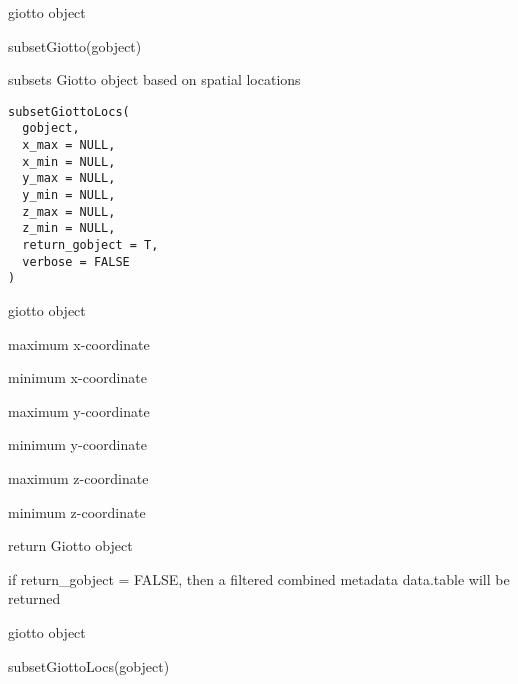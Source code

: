 \documentclass[a4paper]{book}
\begin{document}
%
\begin{Value}
giotto object
\end{Value}
%
\begin{Examples}
\begin{ExampleCode}
    subsetGiotto(gobject)
\end{ExampleCode}
\end{Examples}
%
\begin{Description}\relax
subsets Giotto object based on spatial locations
\end{Description}
%
\begin{Usage}
\begin{verbatim}
subsetGiottoLocs(
  gobject,
  x_max = NULL,
  x_min = NULL,
  y_max = NULL,
  y_min = NULL,
  z_max = NULL,
  z_min = NULL,
  return_gobject = T,
  verbose = FALSE
)
\end{verbatim}
\end{Usage}
%
\begin{Arguments}
\begin{ldescription}
\item[\code{gobject}] giotto object

\item[\code{x\_max}] maximum x-coordinate

\item[\code{x\_min}] minimum x-coordinate

\item[\code{y\_max}] maximum y-coordinate

\item[\code{y\_min}] minimum y-coordinate

\item[\code{z\_max}] maximum z-coordinate

\item[\code{z\_min}] minimum z-coordinate

\item[\code{return\_gobject}] return Giotto object
\end{ldescription}
\end{Arguments}
%
\begin{Details}\relax
if return\_gobject = FALSE, then a filtered combined metadata data.table will be returned
\end{Details}
%
\begin{Value}
giotto object
\end{Value}
%
\begin{Examples}
\begin{ExampleCode}
    subsetGiottoLocs(gobject)
\end{ExampleCode}
\end{Examples}
\end{document}
